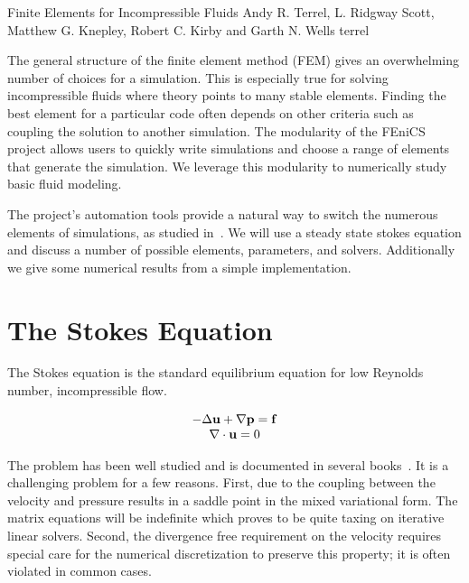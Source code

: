               {Finite Elements for Incompressible Fluids}
              {Andy R. Terrel, L. Ridgway Scott, Matthew G. Knepley, Robert C. Kirby and Garth N. Wells}
              {terrel}

The general structure of the finite element method (FEM) gives an overwhelming
number of choices for a simulation.  This is especially true for solving
incompressible fluids where theory points to many stable elements.  Finding the
best element for a particular code often depends on other criteria such as
coupling the solution to another simulation.  The modularity of the FEniCS
project allows users to quickly write simulations and choose a range of
elements that generate the simulation.  We leverage this modularity to
numerically study basic fluid modeling.

The \fenics{} project's automation tools provide a natural way to switch the
numerous elements of simulations, as studied in~\cite{TerrelScott2008}.  We
will use a steady state stokes equation and discuss a number of possible
elements, parameters, and solvers.  Additionally we give some numerical results
from a simple implementation.

\section{The Stokes Equation}
\label{terrel:section:Stokes}

The Stokes equation is the standard equilibrium equation for low Reynolds
number, incompressible flow.

  \begin{equation*}\label{terrel:eqn:StrongStokes}
    \begin{array}{c} -\Delta{\bf u} + \nabla{{\bf p}} = {\bf f} \\
     \nabla\cdot{{\bf u}} = 0\end{array}
 \end{equation*}

 The problem has been well studied and is documented in several
 books~\cite{BrennerScott2008, BrezziFortin1991}.  It is a challenging problem
 for a few reasons.  First, due to the coupling between the velocity and
 pressure results in a saddle point in the mixed variational form.  The matrix
 equations will be indefinite which proves to be quite taxing on iterative
 linear solvers. Second, the divergence free requirement on the velocity
 requires special care for the numerical discretization to preserve this
 property; it is often violated in common cases.

